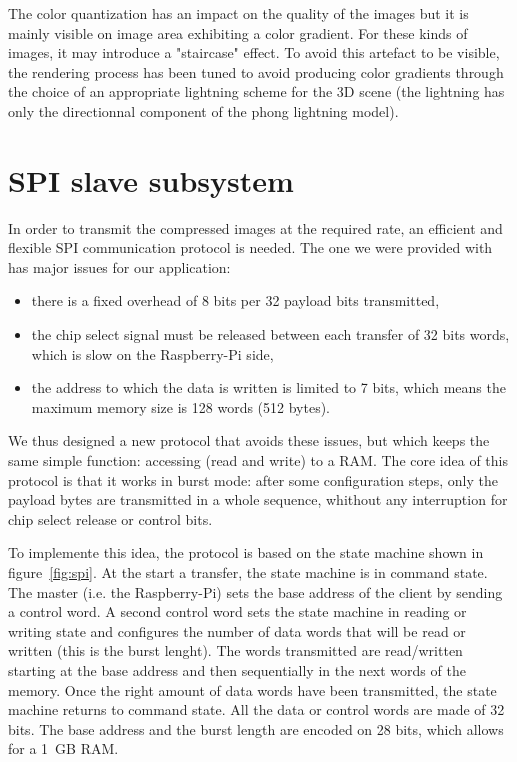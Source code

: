 \documentclass[english, DIV=13]{scrreprt}
\begin{document}
The color quantization has an impact on the quality of the images
but it is mainly visible on image area exhibiting a color gradient.
For these kinds of images,
it may introduce a "staircase" effect. To avoid this artefact to be visible,
the rendering process has been tuned to avoid producing color gradients
through the choice of an appropriate lightning scheme for the 3D scene (the lightning
has only the directionnal component of the phong lightning model).

\section{SPI slave subsystem}
\label{sec:spi}

In order to transmit the compressed images at the required rate, an efficient and
flexible SPI communication protocol is needed.
The one we were provided with has major issues for our application:
\begin{itemize}
    \item there is a fixed overhead of 8 bits per 32 payload bits transmitted,
    \item the chip select signal must be released between each transfer of 32 bits
    words, which is slow on the Raspberry-Pi side,
    \item the address to which the data is written is limited to 7 bits, which means
    the maximum memory size is 128 words (512 bytes).
\end{itemize}

We thus designed a new protocol that avoids these issues, but which keeps the same simple
function: accessing (read and write) to a RAM.
The core idea of this protocol is that it works in burst mode: after some configuration
steps,
only the payload bytes are transmitted in a whole sequence, whithout any interruption for
chip select release or control bits.

To implemente this idea, the protocol is based on the state machine shown in
figure~\ref{fig:spi}.
At the start a transfer, the state machine is in command state.
The master (i.e. the Raspberry-Pi) sets the base address of the client by
sending a control word. A second control word sets the state machine in reading or
writing state and configures the number of data words that will be read or written
(this is the burst lenght).
The words transmitted are read/written starting at the base address and then sequentially
in the next words of the memory.
Once the right amount of data words have been transmitted, the state machine returns to
command state.
All the data or control words are made of 32 bits. The base address and the burst length
are encoded on 28 bits, which allows for a \SI{1}{GB} RAM.
\end{document}
